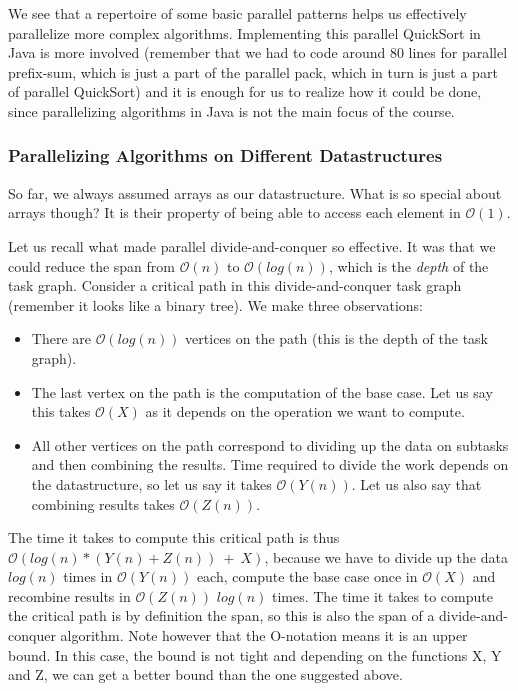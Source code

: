 \documentclass[main.tex]{subfiles}
\begin{document}
We see that a repertoire of some basic parallel patterns helps us effectively parallelize more complex algorithms. Implementing this parallel QuickSort in Java is more involved (remember that we had to code around 80 lines for parallel prefix-sum, which is just a part of the parallel pack, which in turn is just a part of parallel QuickSort) and it is enough for us to realize how it could be done, since parallelizing algorithms in Java is not the main focus of the course.

\subsubsection{Parallelizing Algorithms on Different Datastructures}
So far, we always assumed arrays as our datastructure. What is so special about arrays though? It is their property of being able to access each element in \(\mathcal{O}(1)\).

Let us recall what made parallel divide-and-conquer so effective. It was that we could reduce the span from \(\mathcal{O}(n)\) to \(\mathcal{O}\left(log(n)\right)\), which is the \textit{depth} of the task graph. Consider a critical path in this divide-and-conquer task graph (remember it looks like a binary tree). We make three observations:

\begin{itemize}
  \item There are \(\mathcal{O}\left(log(n)\right)\) vertices on the path (this is the depth of the task graph).
  \item The last vertex on the path is the computation of the base case. Let us say this takes \(\mathcal{O}(X)\) as it depends on the operation we want to compute.
  \item All other vertices on the path correspond to dividing up the data on subtasks and then combining the results. Time required to divide the work depends on the datastructure, so let us say it takes \(\mathcal{O}(Y(n))\). Let us also say that combining results takes \(\mathcal{O}(Z(n))\).
\end{itemize}

\noindent The time it takes to compute this critical path is thus \(\mathcal{O}\left(log(n)*(Y(n) + Z(n))\ +\ X\right)\), because we have to divide up the data \(log(n)\) times in \(\mathcal{O}(Y(n))\) each, compute the base case once in \(\mathcal{O}(X)\) and recombine results in \(\mathcal{O}(Z(n))\) \(log(n)\) times. The time it takes to compute the critical path is by definition the span, so this is also the span of a divide-and-conquer algorithm. Note however that the O-notation means it is an upper bound. In this case, the bound is not tight and depending on the functions X, Y and Z, we can get a better bound than the one suggested above.
\end{document}
